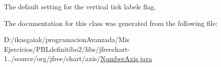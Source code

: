 The default setting for the vertical tick labels flag. 

The documentation for this class was generated from the following file\+:\begin{DoxyCompactItemize}
\item 
D\+:/ikasgaiak/programacion\+Avanzada/\+Mis Ejercicios/\+P\+B\+Ldefinitibo2/libs/jfreechart-\/1../source/org/jfree/chart/axis/\mbox{\hyperlink{_number_axis_8java}{Number\+Axis.\+java}}\end{DoxyCompactItemize}
